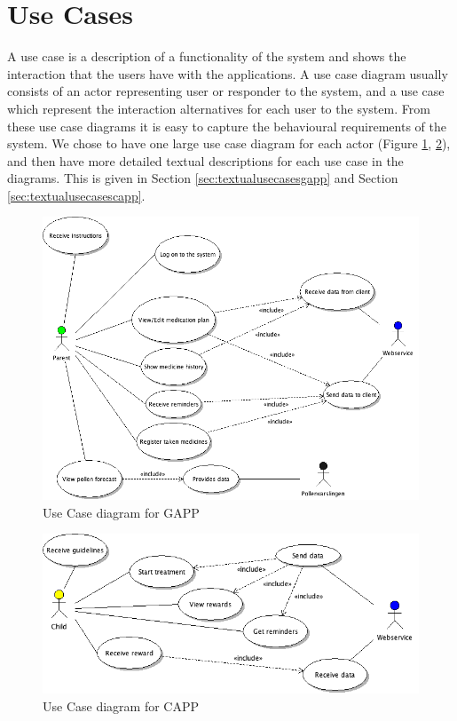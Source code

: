 \section{Use Cases}
\label{sec:useCases}
A use case is a description of a functionality of the system and shows the interaction that 
the users have with the applications. A use case diagram usually consists of an actor representing 
user or responder to the system, and a use case which represent the interaction alternatives 
for each user to the system. From these use case diagrams it is easy to capture the behavioural 
requirements of the system. We chose to have one large use case diagram for each actor
 (Figure \ref{fig:usecasegapp}, \ref{fig:usecasecapp}), and then have more detailed textual descriptions for each use case 
in the diagrams. This is given in Section \ref{sec:textualusecasesgapp} and Section \ref{sec:textualusecasescapp}.

\begin{figure}
	\centering
	\includegraphics[height=0.40\paperheight]{Pictures/ArchPictures/usacasegapp.png}
		\caption{Use Case diagram for GAPP}
		\label{fig:usecasegapp}
\end{figure}

\begin{figure}
	\centering
	\includegraphics[width=\linewidth]{Pictures/ArchPictures/usecasechild.png}
		\caption{Use Case diagram for CAPP}
		\label{fig:usecasecapp}
\end{figure}



